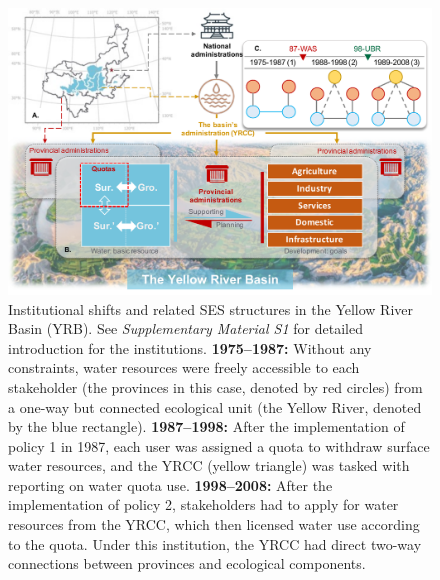 \documentclass{../nsr}
\begin{document}
\begin{figure}[!ht]
    \centering
    \includegraphics[width=32pc]{diagrams/diagram.pdf}
	\caption{
		Institutional shifts and related SES structures in the Yellow River Basin (YRB). See \textit{Supplementary Material S1} for detailed introduction for the institutions.
		\textbf{1975–1987:} Without any constraints, water resources were freely accessible to each stakeholder (the provinces in this case, denoted by red circles) from a one-way but connected ecological unit (the Yellow River, denoted by the blue rectangle).
		\textbf{1987–1998:} After the implementation of policy 1 in 1987, each user was assigned a quota to withdraw surface water resources, and the YRCC (yellow triangle) was tasked with reporting on water quota use.
		\textbf{1998–2008:} After the implementation of policy 2, stakeholders had to apply for water resources from the YRCC, which then licensed water use according to the quota. Under this institution, the YRCC had direct two-way connections between provinces and ecological components.
}
\end{figure}
\end{document}
